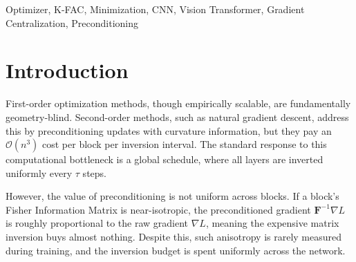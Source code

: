 \documentclass[conference]{IEEEtran}
\begin{document}
\begin{abstract}
The current state of the art in deep learning optimization typically employs zeroth-, first-, and second-order gradient updates. We propose Trinity, a novel optimization framework that unifies these approaches by using zeroth-order curvature sensing for selective natural-gradient preconditioning. Trinity introduces a forward-only second-difference curvature sensor that estimates the effective rank of the Fisher Information Matrix per block at minimal overhead. This sensor output drives a controller that restricts expensive K-FAC inversions to layers where the geometry is highly curved, while an AdamW actuator with magnitude grafting ensures stable scale-safe updates elsewhere. Additionally, the zeroth-order signal acts as a direct saddle-escape actuator. Benchmark evaluations on extreme 100:1 long-tailed label imbalances across diverse architectures demonstrate that Trinity matches the performance of always-on K-FAC at a fraction of the inversion cost.
\end{abstract}

\begin{IEEEkeywords}
Optimizer, K-FAC, Minimization, CNN, Vision Transformer, Gradient Centralization, Preconditioning
\end{IEEEkeywords}



\section{Introduction}
\label{sec:introduction}

First-order optimization methods, though empirically scalable, are fundamentally geometry-blind. Second-order methods, such as natural gradient descent, address this by preconditioning updates with curvature information, but they pay an $\mathcal{O}(n^3)$ cost per block per inversion interval. The standard response to this computational bottleneck is a global schedule, where all layers are inverted uniformly every $\tau$ steps.

However, the value of preconditioning is not uniform across blocks. If a block's Fisher Information Matrix is near-isotropic, the preconditioned gradient $\mathbf{F}^{-1}\nabla L$ is roughly proportional to the raw gradient $\nabla L$, meaning the expensive matrix inversion buys almost nothing. Despite this, such anisotropy is rarely measured during training, and the inversion budget is spent uniformly across the network.
\end{document}
